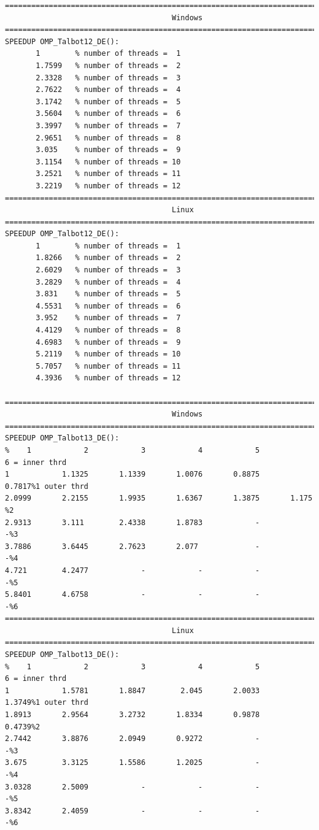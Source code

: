 \documentclass[a4paper,10pt]{report}%
\begin{document}
\begin{lstlisting}
====================================================================================
                                      Windows
====================================================================================
SPEEDUP OMP_Talbot12_DE():
       1        % number of threads =  1
       1.7599   % number of threads =  2
       2.3328   % number of threads =  3
       2.7622   % number of threads =  4
       3.1742   % number of threads =  5
       3.5604   % number of threads =  6
       3.3997   % number of threads =  7
       2.9651   % number of threads =  8
       3.035    % number of threads =  9
       3.1154   % number of threads = 10
       3.2521   % number of threads = 11
       3.2219   % number of threads = 12
====================================================================================
                                      Linux
====================================================================================
SPEEDUP OMP_Talbot12_DE():
       1        % number of threads =  1
       1.8266   % number of threads =  2
       2.6029   % number of threads =  3
       3.2829   % number of threads =  4
       3.831    % number of threads =  5
       4.5531   % number of threads =  6
       3.952    % number of threads =  7
       4.4129   % number of threads =  8
       4.6983   % number of threads =  9
       5.2119   % number of threads = 10
       5.7057   % number of threads = 11
       4.3936   % number of threads = 12

====================================================================================
                                      Windows
====================================================================================
SPEEDUP OMP_Talbot13_DE():
%    1            2            3            4            5            6 = inner thrd
1            1.1325       1.1339       1.0076       0.8875       0.7817%1 outer thrd
2.0999       2.2155       1.9935       1.6367       1.3875       1.175 %2
2.9313       3.111        2.4338       1.8783            -            -%3
3.7886       3.6445       2.7623       2.077             -            -%4
4.721        4.2477            -            -            -            -%5
5.8401       4.6758            -            -            -            -%6
====================================================================================
                                      Linux
====================================================================================
SPEEDUP OMP_Talbot13_DE():
%    1            2            3            4            5            6 = inner thrd
1            1.5781       1.8847        2.045       2.0033       1.3749%1 outer thrd
1.8913       2.9564       3.2732       1.8334       0.9878       0.4739%2
2.7442       3.8876       2.0949       0.9272            -            -%3
3.675        3.3125       1.5586       1.2025            -            -%4
3.0328       2.5009            -            -            -            -%5
3.8342       2.4059            -            -            -            -%6
\end{lstlisting}
\end{document}
